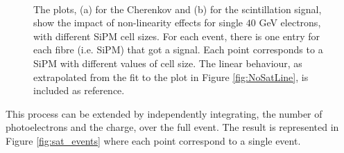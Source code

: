 \begin{figure}
	\centering
	 \\
	\caption{The plots, (a) for the Cherenkov and (b) for the scintillation signal, show the impact of non-linearity effects for single $40$ GeV electrons, with different SiPM cell sizes. For each event, there is one entry for each fibre (i.e. SiPM) that got a signal.
	Each point corresponds to a SiPM with different values of cell size.
	The linear behaviour, as extrapolated from the fit to the plot in Figure \ref{fig:NoSatLine}, is included as reference.}
	\label{fig:sat_fibres}
\end{figure}

This process can be extended by independently integrating, the number of photoelectrons and the charge, over the full event. The result is represented in Figure \ref{fig:sat_events} where each point correspond to a single event.\\

